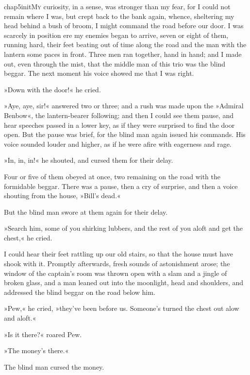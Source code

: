 
   \lettrine[lines=4,image=true]{chap5initM}{y} curiosity, in a sense, was stronger than my fear, for I could not remain where I was, but crept back to the bank again, whence, sheltering my head behind a bush of broom, I might command the road before our door. I was scarcely in position ere my enemies began to arrive, seven or eight of them, running hard, their feet beating out of time along the road and the man with the lantern some paces in front. Three men ran together, hand in hand; and I made out, even through the mist, that the middle man of this trio was the blind beggar. The next moment his voice showed me that I was right.

»Down with the door!« he cried.

»Aye, aye, sir!« answered two or three; and a rush was made upon the »Admiral Benbow«, the lantern-bearer following; and then I could see them pause, and hear speeches passed in a lower key, as if they were surprised to find the door open. But the pause was brief, for the blind man again issued his commands. His voice sounded louder and higher, as if he were afire with eagerness and rage.

»In, in, in!« he shouted, and cursed them for their delay.

Four or five of them obeyed at once, two remaining on the road with the formidable beggar. There was a pause, then a cry of surprise, and then a voice shouting from the house, »Bill's dead.«

But the blind man swore at them again for their delay.

»Search him, some of you shirking lubbers, and the rest of you aloft and get the chest,« he cried.

I could hear their feet rattling up our old stairs, so that the house must have shook with it. Promptly afterwards, fresh sounds of astonishment arose; the window of the captain's room was thrown open with a slam and a jingle of broken glass, and a man leaned out into the moonlight, head and shoulders, and addressed the blind beggar on the road below him.

»Pew,« he cried, »they've been before us. Someone's turned the chest out alow and aloft.«

»Is it there?« roared Pew.

»The money's there.«

The blind man cursed the money.


